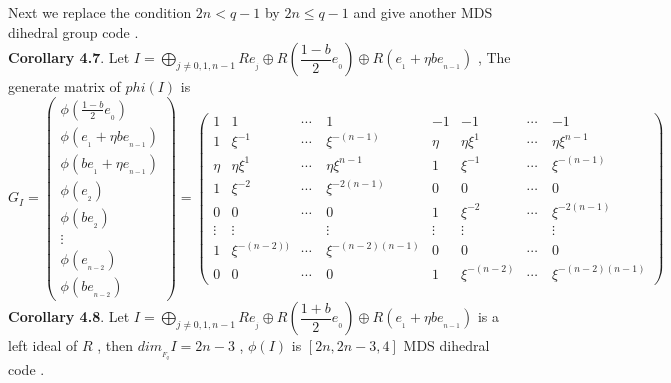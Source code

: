 \documentclass{article}
\begin{document}
Next we replace the condition $2n<q-1$ by $2n\leq q-1$ and give another MDS dihedral group code .\\
\textbf{Corollary 4.7}. Let $I=\mathop{\bigoplus}\limits_{j\neq 0,1,n-1}Re_{_j}\oplus R(\dfrac{1-b}{2}e_{_0})\oplus R(e_{_1}+\eta be_{_{n-1}})$ , The generate matrix of $phi(I)$ is 
\begin{equation*}
    G_{I}=\begin{pmatrix}
        \phi(\frac{1-b}{2}e_{_0})\\
        \phi(e_{_1}+\eta be_{_{n-1}})\\
        \phi(be_{_1}+\eta e_{_{n-1}})\\
        \phi(e_{_2})\\
        \phi(be_{_2})\\
        \vdots\\
        \phi(e_{_{n-2}})\\
        \phi(be_{_{n-2}})
    \end{pmatrix}
    =\begin{pmatrix}
        1&1&\cdots&1&-1&-1&\cdots&-1\\
        1&\xi^{\scriptscriptstyle-1}&\cdots&\xi^{\scriptscriptstyle-(n-1)}&\eta&\eta\xi^{\scriptscriptstyle1}&\cdots&\eta\xi^{\scriptscriptstyle n-1}\\
        \eta&\eta\xi^{\scriptscriptstyle1}&\cdots&\eta\xi^{\scriptscriptstyle n-1}&1&\xi^{\scriptscriptstyle-1}&\cdots&\xi^{\scriptscriptstyle-(n-1)}\\
        1&\xi^{\scriptscriptstyle-2}&\cdots&\xi^{\scriptscriptstyle-2(n-1)}&0&0&\cdots&0\\
        0&0&\cdots&0&1&\xi^{\scriptscriptstyle-2}&\cdots&\xi^{\scriptscriptstyle-2(n-1)}\\
        \vdots&\vdots&\quad&\vdots&\vdots&\vdots&\quad&\vdots\\
        1&\xi^{\scriptscriptstyle-(n-2))}&\cdots&\xi^{\scriptscriptstyle-(n-2)(n-1)}&0&0&\cdots&0\\
        0&0&\cdots&0&1&\xi^{\scriptscriptstyle-(n-2)}&\cdots&\xi^{\scriptscriptstyle-(n-2)(n-1)}
    \end{pmatrix}
\end{equation*}
\textbf{Corollary 4.8}. Let $I=\mathop{\bigoplus}\limits_{j\neq 0,1,n-1}Re_{_j}\oplus R(\dfrac{1+b}{2}e_{_0})\oplus R(e_{_1}+\eta be_{_{n-1}})$ is a left ideal of $R$ , then $dim_{_{F_q}}I=2n-3$ , $\phi(I)$ is $[2n,2n-3,4]$ MDS dihedral code .
\end{document}
